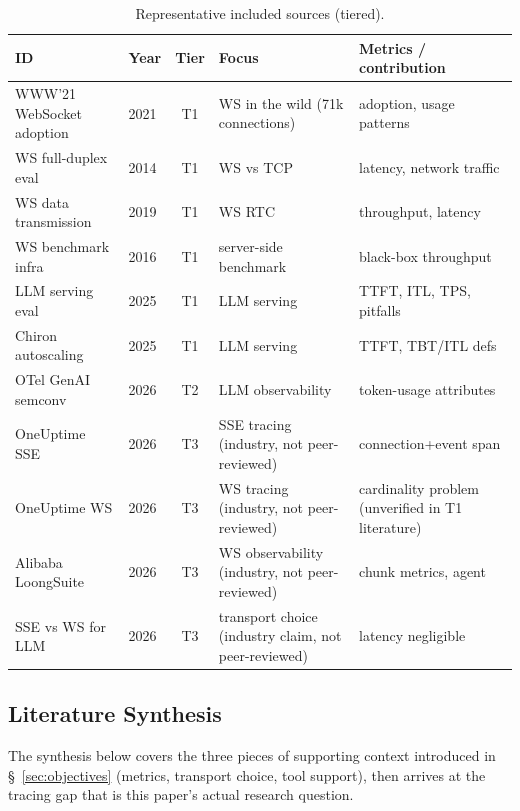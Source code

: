 \documentclass[11pt]{article}
\begin{document}
\begin{table}[H]
\centering\footnotesize
\caption{Representative included sources (tiered).}
\label{tab:sources}
\begin{tabularx}{\textwidth}{@{}l l c Y Y@{}}
\toprule
ID & Year & Tier & Focus & Metrics / contribution \\
\midrule
WWW'21 WebSocket adoption \cite{murley2021} & 2021 & T1 & WS in the wild (71k connections) & adoption, usage patterns \\
WS full-duplex eval \cite{ws2014} & 2014 & T1 & WS vs TCP & latency, network traffic \\
WS data transmission \cite{ws2019} & 2019 & T1 & WS RTC & throughput, latency \\
WS benchmark infra \cite{ws2016bench} & 2016 & T1 & server-side benchmark & black-box throughput \\
LLM serving eval \cite{arxivserving2025} & 2025 & T1 & LLM serving & TTFT, ITL, TPS, pitfalls \\
Chiron autoscaling \cite{chiron2025} & 2025 & T1 & LLM serving & TTFT, TBT/ITL defs \\
OTel GenAI semconv \cite{otelgenai2026} & 2026 & T2 & LLM observability & token-usage attributes \\
OneUptime SSE \cite{oneuptimesse2026} & 2026 & T3 & SSE tracing (industry, not peer-reviewed) & connection+event span \\
OneUptime WS \cite{oneuptimews2026} & 2026 & T3 & WS tracing (industry, not peer-reviewed) & cardinality problem (unverified in T1 literature) \\
Alibaba LoongSuite \cite{alibabaws2026} & 2026 & T3 & WS observability (industry, not peer-reviewed) & chunk metrics, agent \\
SSE vs WS for LLM \cite{buildmvpfast2026} & 2026 & T3 & transport choice (industry claim, not peer-reviewed) & latency negligible \\
\bottomrule
\end{tabularx}
\end{table}

\subsection{Literature Synthesis}
\label{sec:results-synthesis}
The synthesis below covers the three pieces of supporting context introduced in \S~\ref{sec:objectives} (metrics, transport choice, tool support), then arrives at the tracing gap that is this paper's actual research question.
\end{document}
